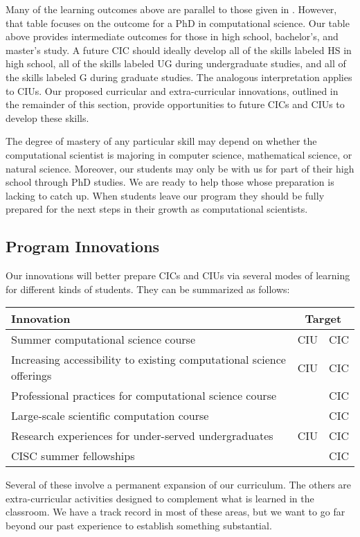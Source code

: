 \documentclass[11pt]{NSFamsart}
\begin{document}
Many of the learning outcomes above are parallel to those given in \cite[Table 1]{RudEtal18a}.   However, that table focuses on the outcome for a PhD in computational science.  Our table above provides intermediate outcomes for those in high school, bachelor's, and master's study.  A future CIC should ideally develop all of the skills labeled HS in high school, all of the skills labeled UG during undergraduate studies, and all of the skills labeled G during graduate studies.  The analogous interpretation applies to CIUs.  Our proposed curricular and extra-curricular innovations, outlined in the remainder of this section, provide opportunities to future CICs and CIUs to develop these skills.  

The degree of mastery of any particular skill may depend on whether the computational scientist is majoring in computer science, mathematical science, or natural science.  Moreover, our students may only be with us for part of their high school through PhD studies.  We are ready to help those whose preparation is lacking to catch up.  When students leave our program they should be fully prepared for the next steps in their growth as computational scientists.

\subsection{Program Innovations}
\newcommand{\CampName}{Summer computational science course}
\newcommand{\CurrExistName}{Increasing accessibility to existing computational science offerings}
\newcommand{\RelSoftName}{Professional practices for computational science course} 
\newcommand{\LargeSCName}{Large-scale scientific computation course}
\newcommand{\PhyChemBioCompSciName}{New computational natural sciences course}
\newcommand{\CODSummerName}{Research experiences for under-served undergraduates}
\newcommand{\FellowName}{CISC summer fellowships}

Our innovations will better prepare CICs and CIUs via several modes of learning for different kinds of students.  They can be summarized as follows:

\begin{center}
\begin{tabular}
{lcc}
Innovation & \multicolumn{2}{c}{Target} \tabularnewline
\toprule
\CampName & CIU & CIC \tabularnewline
\CurrExistName & CIU & CIC \tabularnewline
\RelSoftName &  & CIC \tabularnewline
\LargeSCName &  & CIC \tabularnewline
\CODSummerName & CIU & CIC \tabularnewline
\FellowName &  & CIC \tabularnewline
\bottomrule
\end{tabular}
\end{center}
Several of these involve a permanent expansion of our curriculum. The others are extra-curricular activities designed to complement what is learned in the classroom.  We have a track record in most of these areas, but we want to go far beyond our past experience to establish something substantial.
\end{document}
